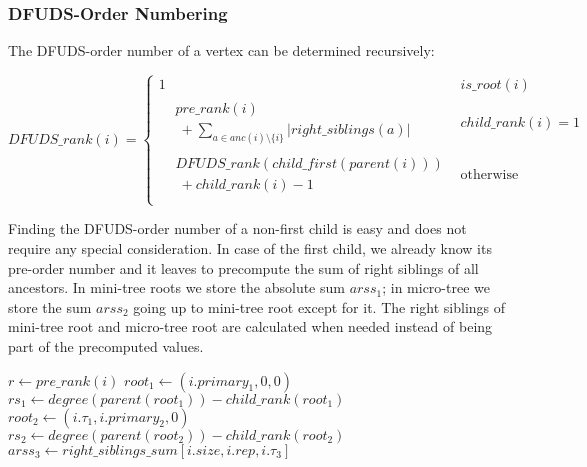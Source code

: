 \subsubsection{DFUDS-Order Numbering}

The DFUDS-order number of a vertex can be determined recursively:

$$
DFUDS\_rank(i) =
\begin{cases}
1 & is\_root(i) \\
\begin{aligned}
& pre\_rank(i) \\
&\ + \sum_{a \in anc(i) \setminus \{i\}} |right\_siblings(a)|
\end{aligned} & child\_rank(i) = 1 \\
\begin{aligned}
& DFUDS\_rank(child\_first(parent(i))) \\
&\  + child\_rank(i) - 1
\end{aligned} & \textrm{otherwise} \\
\end{cases}
$$

Finding the DFUDS-order number of a non-first child is easy and does not require any special consideration.
In case of the first child, we already know its pre-order number and it leaves to precompute the sum of right siblings of all ancestors.
In mini-tree roots we store the absolute sum $arss_1$; in micro-tree we store the sum $arss_2$ going up to mini-tree root except for it.
The right siblings of mini-tree root and micro-tree root are calculated when needed instead of being part of the precomputed values.

\begin{algorithmic}
		\State {}
		\State {}
	\Else
		\State $r \gets pre\_rank(i)$
		\State $root_1 \gets (i.primary_1, 0, 0)$ 
		\State $rs_1 \gets degree(parent(root_1)) - child\_rank(root_1)$ 
			\State $root_2 \gets (i.\tau_1, i.primary_2, 0)$ 
			\State $rs_2 \gets degree(parent(root_2)) - child\_rank(root_2)$
			\State $arss_3 \gets right\_siblings\_sum[i.size, i.rep, i.\tau_3]$
			\State {}
			\State {}
		\Else
			\State {}
		\EndIf
	\EndIf
\EndFunction
\end{algorithmic}

